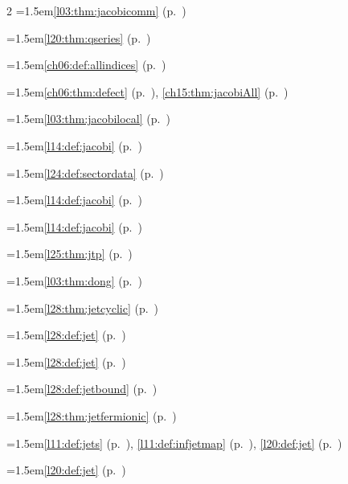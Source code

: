 \begin{multicols}{2}
\hangindent=1.5em\quad \ref{l03:thm:jacobicomm} (p.~\pageref{l03:thm:jacobicomm})\par
\hangindent=1.5em\quad \ref{l20:thm:qseries} (p.~\pageref{l20:thm:qseries})\par
\hangindent=1.5em\quad \ref{ch06:def:allindices} (p.~\pageref{ch06:def:allindices})\par
\hangindent=1.5em\quad \ref{ch06:thm:defect} (p.~\pageref{ch06:thm:defect}), \ref{ch15:thm:jacobiAll} (p.~\pageref{ch15:thm:jacobiAll})\par
\hangindent=1.5em\quad \ref{l03:thm:jacobilocal} (p.~\pageref{l03:thm:jacobilocal})\par
\hangindent=1.5em\quad \ref{l14:def:jacobi} (p.~\pageref{l14:def:jacobi})\par
\hangindent=1.5em\quad \ref{l24:def:sectordata} (p.~\pageref{l24:def:sectordata})\par
\hangindent=1.5em\quad \ref{l14:def:jacobi} (p.~\pageref{l14:def:jacobi})\par
\hangindent=1.5em\quad \ref{l14:def:jacobi} (p.~\pageref{l14:def:jacobi})\par
\hangindent=1.5em\quad \ref{l25:thm:jtp} (p.~\pageref{l25:thm:jtp})\par
\hangindent=1.5em\quad \ref{l03:thm:dong} (p.~\pageref{l03:thm:dong})\par
\hangindent=1.5em\quad \ref{l28:thm:jetcyclic} (p.~\pageref{l28:thm:jetcyclic})\par
\hangindent=1.5em\quad \ref{l28:def:jet} (p.~\pageref{l28:def:jet})\par
\hangindent=1.5em\quad \ref{l28:def:jet} (p.~\pageref{l28:def:jet})\par
\hangindent=1.5em\quad \ref{l28:def:jetbound} (p.~\pageref{l28:def:jetbound})\par
\hangindent=1.5em\quad \ref{l28:thm:jetfermionic} (p.~\pageref{l28:thm:jetfermionic})\par
\hangindent=1.5em\quad \ref{l11:def:jets} (p.~\pageref{l11:def:jets}), \ref{l11:def:infjetmap} (p.~\pageref{l11:def:infjetmap}), \ref{l20:def:jet} (p.~\pageref{l20:def:jet})\par
\hangindent=1.5em\quad \ref{l20:def:jet} (p.~\pageref{l20:def:jet})\par

\end{multicols}
